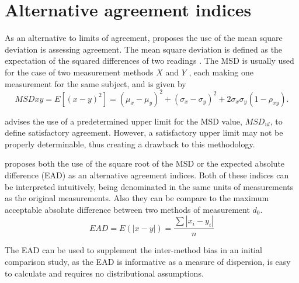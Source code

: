 \documentclass[12pt, a4paper]{report}
\theoremstyle{plain}
\theoremstyle{definition}
\theoremstyle{remark}
\begin{document}
	
	
	
	\section{Alternative agreement indices}
	As an alternative to limits of agreement, \citet{lin2002} proposes the use of
	the mean square deviation is assessing agreement. The mean square
	deviation is defined as the expectation of the squared differences
	of two readings . The MSD is usually used for the case of two
	measurement methods $X$ and $Y$ , each making one measurement for
	the same subject, and is given by
	\[
	MSDxy = E[(x - y)^2]  = (\mu_{x} - \mu_{y})^2 + (\sigma_{x} -
	\sigma_{y})^2 + 2\sigma_{x}\sigma_{y}(1-\rho_{xy}).
	\]
	
	
	\citet{Barnhart} advises the use of a predetermined upper limit
	for the MSD value, $MSD_{ul}$, to define satisfactory agreement.
	However, a satisfactory upper limit may not be properly
	determinable, thus creating a drawback to this methodology.
	
	
	\citet{Barnhart} proposes both the use of the square root of the
	MSD or the expected absolute difference (EAD) as an alternative agreement indices. Both of these indices can be interpreted intuitively, being denominated in the same units of measurements as the original
	measurements. Also they can be compare to the maximum acceptable
	absolute difference between two methods of measurement $d_{0}$.
	\[
	EAD = E(|x - y|) = \frac{\sum |x_{i}- y_{i}|}{n}
	\]
	
	The EAD can be used to supplement the inter-method bias in an
	initial comparison study, as the EAD is informative as a measure
	of dispersion, is easy to calculate and requires no distributional
	assumptions.
	
\end{document}

